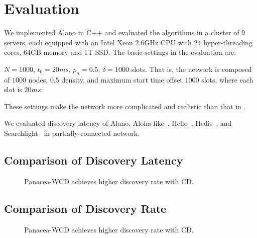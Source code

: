 \section{Evaluation}
\label{Evaluation}

We implemented Alano in C++ and evaluated the algorithms in a cluster of 9 servers, each equipped with an Intel Xeon 2.6GHz CPU with 24 hyper-threading cores, 64GB memory and 1T SSD. The basic settings in the evaluation are: 


$N=1000$, $t_0=20ms$, $p_n=0.5$, $\delta=1000$ slots. That is, the network is composed of $1000$ nodes, $0.5$ density, and maximum start time offset $1000$ slots, where each slot is $20 ms$. 

These settings make the network more complicated and realistic than that in \cite{Kandhalu2010, Sun2014b, Qiu2016, Chen2015, Bakht2012, McGlynn2001, Vasudevan2009, Jiang2005, Dutta2008, You2011, Song2014}.

We evaluated discovery latency of Alano, Aloha-like~\cite{You2011}, Hello~\cite{Sun2014b}, Hedis~\cite{}, and Searchlight~\cite{} in partially-connected network. 

\subsection{Comparison of Discovery Latency}

\begin{figure}[!t]
\centering
{}
\hspace{0.01in}
\caption{Panacea-WCD achieves higher discovery rate with CD.}
\label{fig_timerate}
\end{figure}

\subsection{Comparison of Discovery Rate}

\begin{figure}[!t]
\centering
{}
\hspace{0.01in}
\caption{Panacea-WCD achieves higher discovery rate with CD.}
\label{fig_timerate}
\end{figure}


